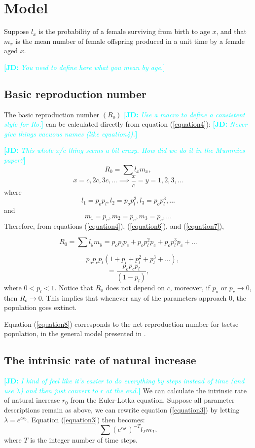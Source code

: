 \documentclass[12pt,a4paper]{article}
\newcommand{\comment}[3]{\textcolor{#1}{\textbf{[#2: }\textsl{#3}\textbf{]}}}
\newcommand{\jd}[1]{\comment{cyan}{JD}{#1}}
\begin{document}
\section*{Model} 

Suppose  $l_{x}$ is the probability of a female surviving from birth to age $x$, and that $m_{x}$ is the mean number of female offspring produced in a unit time by a female aged $x$.  

\jd{You need to define here what you mean by age.}

\subsection*{Basic reproduction number}

The basic reproduction number $(R_o)$
\jd{Use a macro to define a consistent style for Ro.}
can be calculated directly from equation (\ref{equation4}): 
\jd{Never give things vacuous names (like equation4).}

\jd{This whole x/c thing seems a bit crazy. How did we do it in the Mummies paper?}
$$R_{0 }=\sum l_{x}m_{x},$$
$$x=c,2c,3c,... \implies \frac{x}{c}=y = 1,2,3,...$$ 
where
\begin{equation}
\label{equation6} 
l_{1}=p_op_l, l_{2}= p_op_l^2, l_{3}=p_op_l^3, . . .
\end{equation}
and
\begin{equation}
\label{equation7} 
m_{1}=p_c, m_{2}=p_c, m_{3}=p_c, . . .
\end{equation}
Therefore, from equations (\ref{equation4}),  (\ref{equation6}), and  (\ref{equation7}),

$$R_{0 }=\sum l_{y}m_{y} = p_op_lp_c + p_op_l^2 p_c + p_op_l^3p_c + ...$$

$$=p_op_cp_l (1 + p_l + p_l^2 + p_l^3 + ...),$$
\begin{equation}
\label{equation8} 
=\frac{p_op_cp_l}{(1-p_l)},
\end{equation}
where $0 < p_l < 1$. Notice that $R_o$ does not depend on $c$, moreover, if $p_o$ or $p_c \rightarrow{0}$, then $R_o \rightarrow{0}$. This implies that whenever any of the parameters approach $0$, the population goes extinct.

Equation  (\ref{equation8}) corresponds to the net reproduction number for tsetse population, in the general model presented in \cite{Are2019a}.

\subsection*{The intrinsic rate of natural increase}
\jd{I kind of feel like it's easier to do everything by steps instead of time (and use $\lambda$) and then just convert to $r$ at the end.}
We can calculate the intrinsic rate of natural increase $r_0$ from the  Euler-Lotka equation.  Suppose all parameter descriptions remain as above, we can rewrite equation (\ref{equation3}) by letting $\lambda= e^{cr_0}$. Equation (\ref{equation3}) then becomes:
\begin{equation}
\label{equation1008} 
\sum (e^{r_0c})^{-T}l_{T}m_{T}.
\end{equation}
where $ T $ is the integer number of time steps. \\
\end{document}
